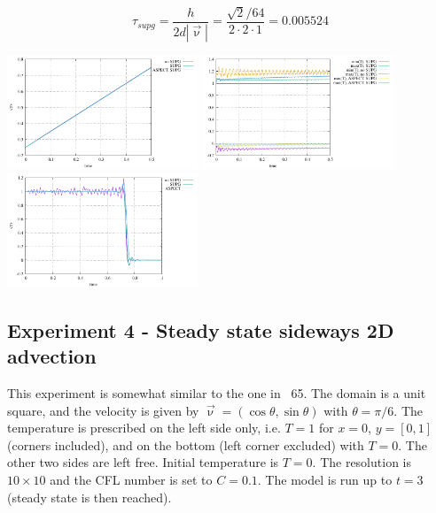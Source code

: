 \[
\tau_{supg} = \frac{h}{2 d |\vec{\upnu}|} = \frac{\sqrt{2}/64}{2 \cdot 2 \cdot 1} = 0.005524
\]

\begin{center}
\includegraphics[width=5.7cm]{python_codes/fieldstone_43/results/experiment3/Q2/avrg_T.pdf}
\includegraphics[width=5.7cm]{python_codes/fieldstone_43/results/experiment3/Q2/stats_T.pdf}
\includegraphics[width=5.7cm]{python_codes/fieldstone_43/results/experiment3/Q2/temperature.pdf}
\end{center}




\subsection*{Experiment 4 - Steady state sideways 2D advection}

This experiment is somewhat similar to the one in \stone~65.
The domain is a unit square, and the velocity is given 
by $\vec\upnu=(\cos \theta, \sin\theta)$ with $\theta=\pi/6$.
The temperature is prescribed on the left side only, i.e. $T=1$ for $x=0$, $y=[0,1]$ 
(corners included), and 
on the bottom (left corner excluded) with $T=0$. The other two sides 
are left free. Initial temperature is $T=0$.
The resolution is $10\times10$ and the CFL number is set to $C=0.1$. 
The model is run up to $t=3$ (steady state is then reached). 

